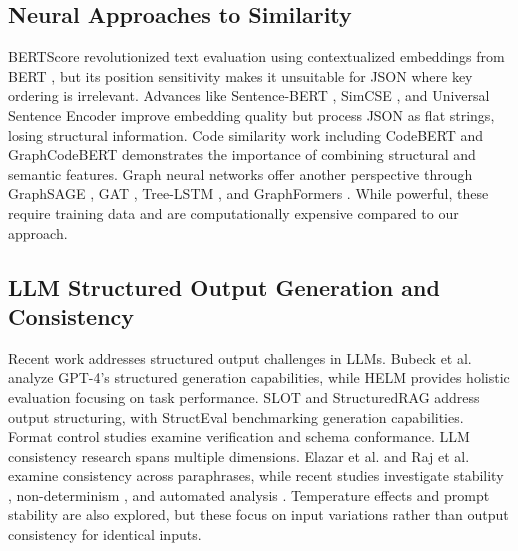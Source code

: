 \documentclass{article}
\begin{document}
\subsection{Neural Approaches to Similarity}
BERTScore \cite{Zhang2020} revolutionized text evaluation using contextualized embeddings from BERT \cite{Devlin2019}, but its position sensitivity makes it unsuitable for JSON where key ordering is irrelevant. Advances like Sentence-BERT \cite{Reimers2019}, SimCSE \cite{Gao2021}, and Universal Sentence Encoder \cite{Cer2018} improve embedding quality but process JSON as flat strings, losing structural information. Code similarity work including CodeBERT \cite{Feng2020} and GraphCodeBERT \cite{Guo2021} demonstrates the importance of combining structural and semantic features. Graph neural networks offer another perspective through GraphSAGE \cite{Hamilton2017}, GAT \cite{Velickovic2018}, Tree-LSTM \cite{Tai2015}, and GraphFormers \cite{Yang2021}. While powerful, these require training data and are computationally expensive compared to our approach.
\subsection{LLM Structured Output Generation and Consistency}
Recent work addresses structured output challenges in LLMs. Bubeck et al. \cite{Bubeck2023} analyze GPT-4's structured generation capabilities, while HELM \cite{Liang2022} provides holistic evaluation focusing on task performance. SLOT \cite{Wang2024slot} and StructuredRAG \cite{shorten2024structuredrag} address output structuring, with StructEval \cite{yang2025structeval} benchmarking generation capabilities. Format control studies \cite{wang-etal-2025-verifiable, geng2025jsonschema} examine verification and schema conformance.
LLM consistency research spans multiple dimensions. Elazar et al. \cite{elazar2021measuring} and Raj et al. \cite{Raj2023} examine consistency across paraphrases, while recent studies investigate stability \cite{atil2024llm}, non-determinism \cite{baldwin2024nondeterminism}, and automated analysis \cite{patwardhan2025automated, wu2025estimating}. Temperature effects \cite{renze2024effect, renze-2024-effect} and prompt stability \cite{chen2025prompt} are also explored, but these focus on input variations rather than output consistency for identical inputs.
\end{document}
